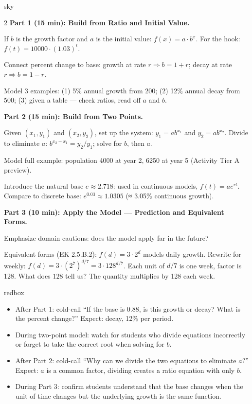 \documentclass[10pt]{article}
\begin{document}
\begin{skillbox}[Lesson]{sky}
\begin{multicols}{2}
\textbf{Part 1 (15 min): Build from Ratio and Initial Value.}

If $b$ is the growth factor and $a$ is the initial value:
$f(x) = a \cdot b^x$. For the hook: $f(t) = 10000 \cdot (1.03)^t$.

Connect percent change to base: growth at rate $r \Rightarrow b = 1+r$;
decay at rate $r \Rightarrow b = 1-r$.

Model 3 examples: (1) 5\% annual growth from 200; (2) 12\% annual decay from 500;
(3) given a table --- check ratios, read off $a$ and $b$.

\columnbreak

\textbf{Part 2 (15 min): Build from Two Points.}

Given $(x_1, y_1)$ and $(x_2, y_2)$, set up the system:
$y_1 = ab^{x_1}$ and $y_2 = ab^{x_2}$.
Divide to eliminate $a$: $b^{x_2 - x_1} = y_2/y_1$; solve for $b$, then $a$.

Model full example: population 4000 at year 2, 6250 at year 5 (Activity Tier A preview).

Introduce the natural base $e \approx 2.718$: used in continuous models, $f(t) = ae^{rt}$.
Compare to discrete base: $e^{0.03} \approx 1.0305$ (≈ 3.05\% continuous growth).

\end{multicols}

\medskip
\textbf{Part 3 (10 min): Apply the Model --- Prediction and Equivalent Forms.}

Emphasize domain cautions: does the model apply far in the future?

Equivalent forms (EK 2.5.B.2): $f(d) = 3 \cdot 2^d$ models daily growth. Rewrite for weekly:
$f(d) = 3 \cdot (2^7)^{d/7} = 3 \cdot 128^{d/7}$. Each unit of $d/7$ is one week, factor is 128.
What does $128$ tell us? The quantity multiplies by 128 each week.
\end{skillbox}

\begin{skillbox}{redbox}
\begin{itemize}[leftmargin=1.2em,itemsep=2pt,topsep=0pt]
  \item After Part 1: cold-call ``If the base is 0.88, is this growth or decay? What is the percent change?''
        Expect: decay, 12\% per period.
  \item During two-point model: watch for students who divide equations incorrectly or forget to
        take the correct root when solving for $b$.
  \item After Part 2: cold-call ``Why can we divide the two equations to eliminate $a$?''
        Expect: $a$ is a common factor, dividing creates a ratio equation with only $b$.
  \item During Part 3: confirm students understand that the base changes when the unit of time changes
        but the underlying growth is the same function.
\end{itemize}
\end{skillbox}
\end{document}
